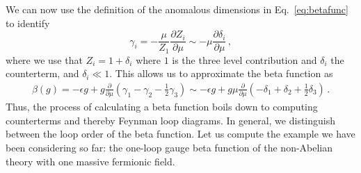 We can now use the definition of the anomalous dimensions in Eq.~\eqref{eq:betafunc} to identify
\begin{equation}
    \gamma_i = - \frac{\mu}{Z_1}  \frac{\partial Z_i}{\partial\mu} \sim -\mu  \frac{\partial \delta_i}{\partial \mu}\,,
\end{equation}
where we use that $Z_i=1+\delta_i$ where $1$ is the three level contribution and $\delta_i$ the counterterm, and $\delta_i\ll 1$. This allows us to approximate the beta function as
\begin{align}
    \beta(g) =-\epsilon g+ g  \frac{\partial}{\partial\mu} \left( \gamma_1 - \gamma_2 - \frac{1}{2} \gamma_3 \right) \sim-\epsilon g+ g \mu \frac{\partial}{\partial\mu} \left( -\delta_1 + \delta_2 + \frac{1}{2} \delta_3 \right) \,.
\end{align}
Thus, the process of calculating a beta function boils down to computing counterterms and thereby Feynman loop diagrams. In general, we distinguish between the loop order of the beta function. Let us compute the example we have been considering so far: the one-loop gauge beta function of the non-Abelian theory with one massive fermionic field. 

